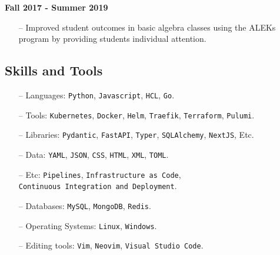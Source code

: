 \documentclass{article}
\begin{document}
\textbf{Fall 2017 - Summer 2019}

\begin{itemize}
\tightlist
\item[--]
  Improved student outcomes in basic algebra classes using the ALEKs
  program by providing students individual attention.
\end{itemize}

\begin{center}
\section*{Skills and Tools}\label{skills-and-tools}
\end{center}

\begin{itemize}
\tightlist
\item[--]
  Languages: \texttt{Python}, \texttt{Javascript}, \texttt{HCL},
  \texttt{Go}.
\item[--]
  Tools: \texttt{Kubernetes}, \texttt{Docker}, \texttt{Helm},
  \texttt{Traefik}, \texttt{Terraform}, \texttt{Pulumi}.
\item[--]
  Libraries: \texttt{Pydantic}, \texttt{FastAPI}, \texttt{Typer},
  \texttt{SQLAlchemy}, \texttt{NextJS}, Etc.
\item[--]
  Data: \texttt{YAML}, \texttt{JSON}, \texttt{CSS}, \texttt{HTML},
  \texttt{XML}, \texttt{TOML}.
\item[--]
  Etc: \texttt{Pipelines}, \texttt{Infrastructure\ as\ Code},
  \texttt{Continuous\ Integration\ and\ Deployment}.
\item[--]
  Databases: \texttt{MySQL}, \texttt{MongoDB}, \texttt{Redis}.
\item[--]
  Operating Systems: \texttt{Linux}, \texttt{Windows}.
\item[--]
  Editing tools: \texttt{Vim}, \texttt{Neovim},
  \texttt{Visual\ Studio\ Code}.
\end{itemize}
\end{document}
